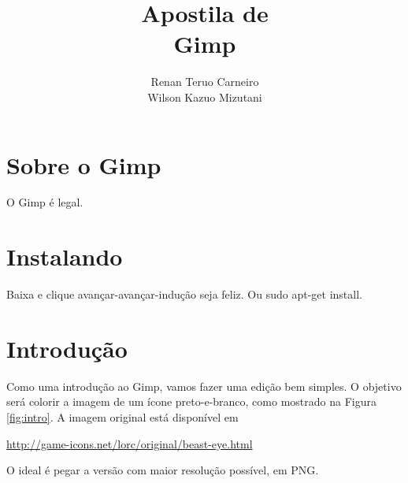 \documentclass[12pt,onecolumn]{article}
\begin{document}
\begin{titlepage}

    \title{
        \bf
        \LARGE Apostila de \\
        \Huge  Gimp
    }
    
    \author{Renan Teruo Carneiro \\ Wilson Kazuo Mizutani}
    
    \maketitle
    
    \thispagestyle{empty}
    
\end{titlepage}

\tableofcontents

\clearpage

\section{Sobre o Gimp}
  O Gimp é legal.

\section{Instalando}
  Baixa e clique avançar-avançar-indução seja feliz.
  Ou sudo apt-get install.

\section{Introdução}
  Como uma introdução ao Gimp, vamos fazer uma edição bem simples. O objetivo
  será colorir a imagem de um ícone preto-e-branco, como mostrado na Figura
  \ref{fig:intro}. A imagem original está disponível em
  
  \begin{center}
    \url{http://game-icons.net/lorc/original/beast-eye.html}      
  \end{center}
  
   O ideal é pegar a versão com maior resolução possível, em PNG.
\end{document}

